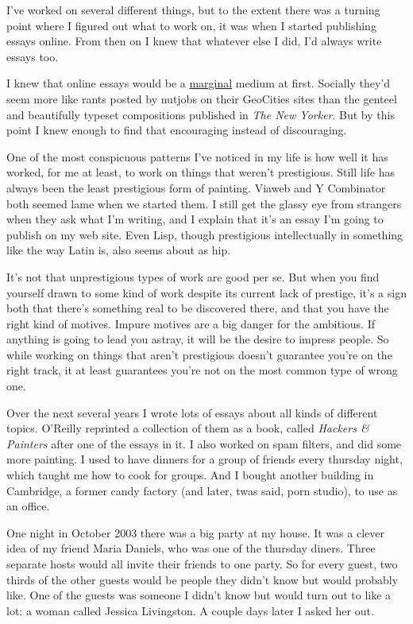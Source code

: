 I've worked on several different things, but to the extent there was a
turning point where I figured out what to work on, it was when I started
publishing essays online. From then on I knew that whatever else I did,
I'd always write essays too.

I knew that online essays would be a \href{marginal.html}{marginal}
medium at first. Socially they'd seem more like rants posted by nutjobs
on their GeoCities sites than the genteel and beautifully typeset
compositions published in \emph{The New Yorker}. But by this point I
knew enough to find that encouraging instead of discouraging.

One of the most conspicuous patterns I've noticed in my life is how well
it has worked, for me at least, to work on things that weren't
prestigious. Still life has always been the least prestigious form of
painting. Viaweb and Y Combinator both seemed lame when we started them.
I still get the glassy eye from strangers when they ask what I'm
writing, and I explain that it's an essay I'm going to publish on my web
site. Even Lisp, though prestigious intellectually in something like the
way Latin is, also seems about as hip.

It's not that unprestigious types of work are good per se. But when you
find yourself drawn to some kind of work despite its current lack of
prestige, it's a sign both that there's something real to be discovered
there, and that you have the right kind of motives. Impure motives are a
big danger for the ambitious. If anything is going to lead you astray,
it will be the desire to impress people. So while working on things that
aren't prestigious doesn't guarantee you're on the right track, it at
least guarantees you're not on the most common type of wrong one.

Over the next several years I wrote lots of essays about all kinds of
different topics. O'Reilly reprinted a collection of them as a book,
called \emph{Hackers \& Painters} after one of the essays in it. I also
worked on spam filters, and did some more painting. I used to have
dinners for a group of friends every thursday night, which taught me how
to cook for groups. And I bought another building in Cambridge, a former
candy factory (and later, twas said, porn studio), to use as an office.

One night in October 2003 there was a big party at my house. It was a
clever idea of my friend Maria Daniels, who was one of the thursday
diners. Three separate hosts would all invite their friends to one
party. So for every guest, two thirds of the other guests would be
people they didn't know but would probably like. One of the guests was
someone I didn't know but would turn out to like a lot: a woman called
Jessica Livingston. A couple days later I asked her out.

